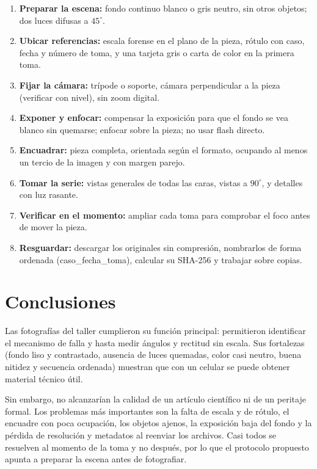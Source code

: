 \documentclass[runningheads]{llncs}
\begin{document}
\begin{enumerate}
\item \textbf{Preparar la escena:} fondo continuo blanco o gris neutro, sin otros objetos; dos luces difusas a $45^\circ$.
\item \textbf{Ubicar referencias:} escala forense en el plano de la pieza, rótulo con caso, fecha y número de toma, y una tarjeta gris o carta de color en la primera toma.
\item \textbf{Fijar la cámara:} trípode o soporte, cámara perpendicular a la pieza (verificar con nivel), sin zoom digital.
\item \textbf{Exponer y enfocar:} compensar la exposición para que el fondo se vea blanco sin quemarse; enfocar sobre la pieza; no usar flash directo.
\item \textbf{Encuadrar:} pieza completa, orientada según el formato, ocupando al menos un tercio de la imagen y con margen parejo.
\item \textbf{Tomar la serie:} vistas generales de todas las caras, vistas a $90^\circ$, y detalles con luz rasante.
\item \textbf{Verificar en el momento:} ampliar cada toma para comprobar el foco antes de mover la pieza.
\item \textbf{Resguardar:} descargar los originales sin compresión, nombrarlos de forma ordenada (caso\_fecha\_toma), calcular su SHA-256 y trabajar sobre copias.
\end{enumerate}

\section{Conclusiones}

Las fotografías del taller cumplieron su función principal: permitieron identificar el mecanismo de falla y hasta medir ángulos y rectitud sin escala. Sus fortalezas (fondo liso y contrastado, ausencia de luces quemadas, color casi neutro, buena nitidez y secuencia ordenada) muestran que con un celular se puede obtener material técnico útil.

Sin embargo, no alcanzarían la calidad de un artículo científico ni de un peritaje formal. Los problemas más importantes son la falta de escala y de rótulo, el encuadre con poca ocupación, los objetos ajenos, la exposición baja del fondo y la pérdida de resolución y metadatos al reenviar los archivos. Casi todos se resuelven al momento de la toma y no después, por lo que el protocolo propuesto apunta a preparar la escena antes de fotografiar.
\end{document}
